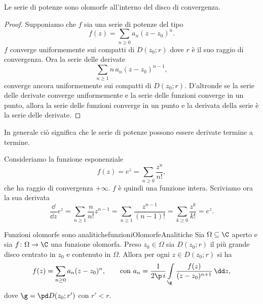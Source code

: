\begin{pr}
	Le serie di potenze sono olomorfe all'interno del disco di convergenza.
\end{pr}

\begin{proof}
	Supponiamo che \(f\) sia una serie di potenze del tipo
	\[
		f(z) = \sum_{n\ge 0}a_n (z-z_0)^n.
	\]
	\(f\) converge uniformemente sui compatti di \(D(z_0;r)\) dove \(r\) è il suo raggio di convergenza. Ora la serie delle derivate
	\[
		\sum_{n\ge 1}n\,a_n (z-z_0)^{n-1},
	\]
	converge ancora uniformemente sui compatti di \(D(z_0;r)\).
	D'altronde se la serie delle derivate converge uniformemente e la serie delle funzioni converge in un punto, allora la serie delle funzioni converge in un punto e la derivata della serie è la serie delle derivate.
\end{proof}

\begin{oss}
	In generale ciò significa che le serie di potenze possono essere derivate termine a termine.
\end{oss}

\begin{ese}
	Consideriamo la funzione esponenziale
	\[
		f(z) = e^z = \sum_{n\ge 0} \frac{z^n}{n!},
	\]
	che ha raggio di convergenza \(+\infty\). \(f\) è quindi una funzione intera.
	Scriviamo ora la sua derivata
	\[
		\frac{\dd}{\dd z}e^z = \sum_{n\ge 1}\frac{n}{n!}z^{n-1} = \sum_{n\ge 1}\frac{z^{n-1}}{(n-1)!} = \sum_{k\ge 0}\frac{z^k}{k!} =e^z.
	\]
\end{ese}

\begin{teor}{Funzioni olomorfe sono analitiche}{funzioniOlomorfeAnalitiche}
	Sia \(\Omega \subseteq \C\) aperto e sia \(f\colon \Omega \to \C\) una funzione olomorfa. Preso \(z_0\in\Omega\) sia \(D(z_0;r)\) il più grande disco centrato in \(z_0\) e contenuto in \(\Omega\).
	Allora per ogni \(z\in D(z_0;r)\) si ha
	\[
		f(z) = \sum_{n\ge 0}a_n (z-z_0)^n, \qquad\text{con }a_n = \frac{1}{2\p\,i}\int\limits_\g \frac{f(z)}{(z-z_0)^{n+1}}\,\dd z,
	\]
	dove \(\g=\pd D(z_0;r')\) con \(r'<r\).
\end{teor}

